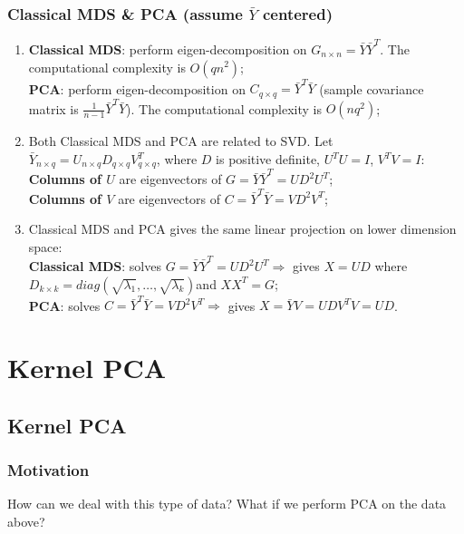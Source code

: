 \documentclass[12pt]{book}
\theoremstyle{definition}
\theoremstyle{remark}
\begin{document}
\subsection{Classical MDS \& PCA (assume $\bar{Y}$ centered)}
\begin{enumerate}
    \item \textbf{Classical MDS}: perform eigen-decomposition on $G_{n\times n} = \bar{Y}\bar{Y}^T$. The computational complexity is $O(qn^2)$;\\
    \textbf{PCA}: perform eigen-decomposition on $C_{q\times q} = \bar{Y}^T\bar{Y}$ (sample covariance matrix is $\frac{1}{n-1}\bar{Y}^T\bar{Y}$). The computational complexity is $O(nq^2)$;\\

    \item Both Classical MDS and PCA are related to SVD. Let $\bar{Y}_{n\times q} = U_{n\times q}D_{q\times q}V_{q\times q}^T$, where $D$ is positive definite, $U^TU = I$, $V^TV = I$: \\
    
    \textbf{Columns of $U$} are eigenvectors of $G = \bar{Y}\bar{Y}^T = UD^2U^T$;\\
    \textbf{Columns of $V$} are eigenvectors of $C = \bar{Y}^T\bar{Y} = VD^2V^T$;\\

    \item Classical MDS and PCA gives the same linear projection on lower dimension space:\\

    \textbf{Classical MDS}: solves $G = \bar{Y}\bar{Y}^T = UD^2U^T \Rightarrow $ gives $X = UD$ where $D_{k\times k} = diag(\sqrt{\lambda_1}, \dots, \sqrt{\lambda_k})$and $XX^T = G$;\\
    \textbf{PCA}: solves $C = \bar{Y}^T\bar{Y} = VD^2V^T \Rightarrow $ gives $X = \bar{Y}V = UDV^TV = UD$.  
\end{enumerate}







\chapter{Kernel PCA}
\section{Kernel PCA}
\subsection{Motivation}
How can we deal with this type of data? What if we perform PCA on the data above?
\end{document}
